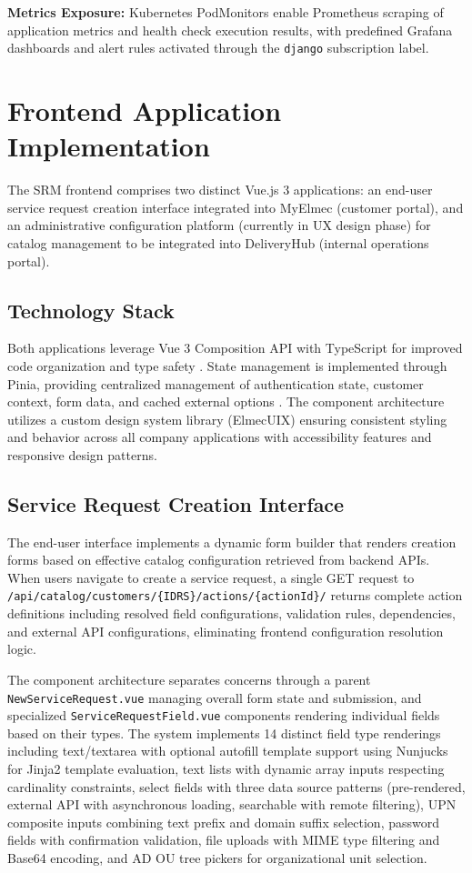 \textbf{Metrics Exposure:} Kubernetes PodMonitors enable Prometheus scraping of application metrics and health check execution results, with predefined Grafana dashboards and alert rules activated through the \texttt{django} subscription label.

\section{Frontend Application Implementation}

The SRM frontend comprises two distinct Vue.js 3 applications: an end-user service request creation interface integrated into MyElmec (customer portal), and an administrative configuration platform (currently in UX design phase) for catalog management to be integrated into DeliveryHub (internal operations portal).

\subsection{Technology Stack}

Both applications leverage Vue 3 Composition API with TypeScript for improved code organization and type safety \cite{vue3}. State management is implemented through Pinia, providing centralized management of authentication state, customer context, form data, and cached external options \cite{pinia}. The component architecture utilizes a custom design system library (ElmecUIX) ensuring consistent styling and behavior across all company applications with accessibility features and responsive design patterns.

\subsection{Service Request Creation Interface}

The end-user interface implements a dynamic form builder that renders creation forms based on effective catalog configuration retrieved from backend APIs. When users navigate to create a service request, a single GET request to \texttt{/api/catalog/customers/\{IDRS\}/actions/\{actionId\}/} returns complete action definitions including resolved field configurations, validation rules, dependencies, and external API configurations, eliminating frontend configuration resolution logic.

The component architecture separates concerns through a parent \texttt{NewServiceRequest.vue} managing overall form state and submission, and specialized \texttt{ServiceRequestField.vue} components rendering individual fields based on their types. The system implements 14 distinct field type renderings including text/textarea with optional autofill template support using Nunjucks for Jinja2 template evaluation, text lists with dynamic array inputs respecting cardinality constraints, select fields with three data source patterns (pre-rendered, external API with asynchronous loading, searchable with remote filtering), UPN composite inputs combining text prefix and domain suffix selection, password fields with confirmation validation, file uploads with MIME type filtering and Base64 encoding, and AD OU tree pickers for organizational unit selection.

